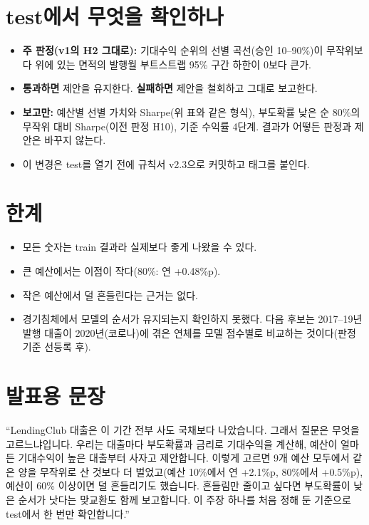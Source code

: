 \documentclass[11pt]{report}
\begin{document}
\section{test에서 무엇을 확인하나}
\begin{itemize}[leftmargin=*]
\item \textbf{주 판정(v1의 H2 그대로):} 기대수익 순위의 선별 곡선(승인 10--90\%)이 무작위보다 위에 있는 면적의 발행월 부트스트랩 95\% 구간 하한이 0보다 큰가.
\item \textbf{통과하면} 제안을 유지한다. \textbf{실패하면} 제안을 철회하고 그대로 보고한다.
\item \textbf{보고만:} 예산별 선별 가치와 Sharpe(위 표와 같은 형식), 부도확률 낮은 순 80\%의 무작위 대비 Sharpe(이전 판정 H10), 기준 수익률 4단계. 결과가 어떻든 판정과 제안은 바꾸지 않는다.
\item 이 변경은 test를 열기 전에 규칙서 v2.3으로 커밋하고 태그를 붙인다.
\end{itemize}

\section{한계}
\begin{itemize}[leftmargin=*]
\item 모든 숫자는 train 결과라 실제보다 좋게 나왔을 수 있다.
\item 큰 예산에서는 이점이 작다(80\%: 연 +0.48\%p).
\item 작은 예산에서 덜 흔들린다는 근거는 없다.
\item 경기침체에서 모델의 순서가 유지되는지 확인하지 못했다. 다음 후보는 2017--19년 발행 대출이 2020년(코로나)에 겪은 연체를 모델 점수별로 비교하는 것이다(판정 기준 선등록 후).
\end{itemize}

\section{발표용 문장}
\begin{keybox}[발표용]
``LendingClub 대출은 이 기간 전부 사도 국채보다 나았습니다. 그래서 질문은 무엇을 고르느냐입니다. 우리는 대출마다 부도확률과 금리로 기대수익을 계산해, 예산이 얼마든 기대수익이 높은 대출부터 사자고 제안합니다. 이렇게 고르면 9개 예산 모두에서 같은 양을 무작위로 산 것보다 더 벌었고(예산 10\%에서 연 +2.1\%p, 80\%에서 +0.5\%p), 예산이 60\% 이상이면 덜 흔들리기도 했습니다. 흔들림만 줄이고 싶다면 부도확률이 낮은 순서가 낫다는 맞교환도 함께 보고합니다. 이 주장 하나를 처음 정해 둔 기준으로 test에서 한 번만 확인합니다.''
\end{keybox}
\end{document}
